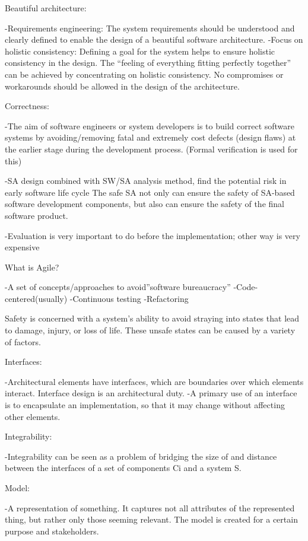 \documentclass[conference]{IEEEtran}
\begin{document}
Beautiful architecture:

-Requirements engineering: The system requirements should be understood and clearly defined to enable the design of a beautiful software architecture.
-Focus on holistic consistency: Defining a goal for the system helps to ensure holistic consistency in the design. The “feeling of everything fitting perfectly together” can be achieved by concentrating on holistic consistency. No compromises or workarounds should be allowed in the design of the architecture. 

Correctness:

-The aim of software engineers or system developers is to build correct software systems by avoiding/removing fatal and extremely cost defects  (design flaws) at the earlier stage during the development process. (Formal verification is used for this)

-SA design combined with SW/SA analysis method, find the potential risk in early software life cycle The safe SA not only can ensure the safety of SA-based software development components, but also can ensure the safety of the final software product.

-Evaluation is very important to do before the implementation; other way is very expensive

What is Agile?

-A set of concepts/approaches to avoid”software bureaucracy”
-Code-centered(usually)
-Continuous testing
-Refactoring

Safety is concerned with a system’s ability to avoid straying into states that lead to damage, injury, or loss of life. These unsafe states can be caused by a variety of factors.

Interfaces:

-Architectural elements have interfaces, which are boundaries over which elements interact. Interface design is an architectural duty.
-A primary use of an interface is to encapsulate an implementation, so that it may change without affecting other elements.

Integrability:

-Integrability can be seen as a problem of bridging the size of and distance between the interfaces of a set of components {Ci} and a system S.

Model:

-A representation of something. It captures not all attributes of the represented thing, but rather only those seeming relevant. The model is created for a certain purpose and stakeholders.
\end{document}
